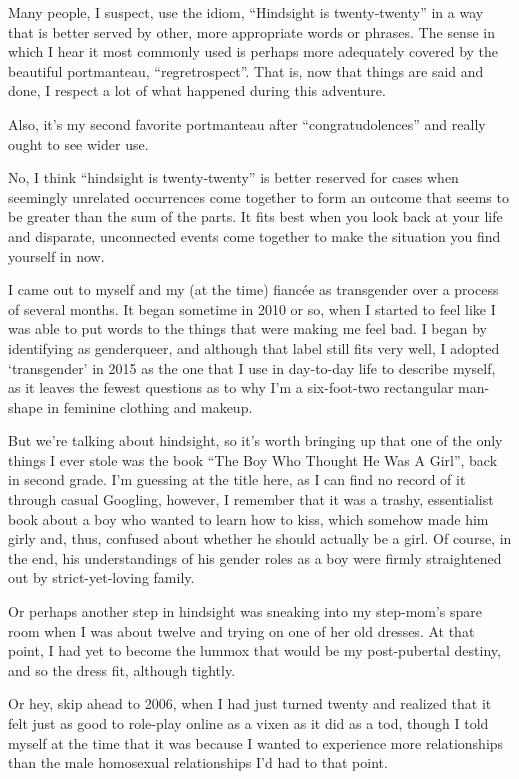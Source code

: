 Many people, I suspect, use the idiom, ``Hindsight is twenty-twenty'' in a way that is better served by other, more appropriate words or phrases.   The sense in which I hear it most commonly used is perhaps more adequately covered by the beautiful portmanteau, ``regretrospect''.  That is, now that things are said and done, I respect a lot of what happened during this adventure.

Also, it's my second favorite portmanteau after ``congratudolences'' and really ought to see wider use.

No, I think ``hindsight is twenty-twenty'' is better reserved for cases when seemingly unrelated occurrences come together to form an outcome that seems to be greater than the sum of the parts.  It fits best when you look back at your life and disparate, unconnected events come together to make the situation you find yourself in now.

I came out to myself and my (at the time) fianc\'ee as transgender over a process of several months.  It began sometime in 2010 or so, when I started to feel like I was able to put words to the things that were making me feel bad.  I began by identifying as genderqueer, and although that label still fits very well, I adopted `transgender' in 2015 as the one that I use in day-to-day life to describe myself, as it leaves the fewest questions as to why I'm a six-foot-two rectangular man-shape in feminine clothing and makeup.

But we're talking about hindsight, so it's worth bringing up that one of the only things I ever stole was the book ``The Boy Who Thought He Was A Girl'', back in second grade.  I'm guessing at the title here, as I can find no record of it through casual Googling, however, I remember that it was a trashy, essentialist book about a boy who wanted to learn how to kiss, which somehow made him girly and, thus, confused about whether he should actually be a girl.  Of course, in the end, his understandings of his gender roles as a boy were firmly straightened out by strict-yet-loving family.

Or perhaps another step in hindsight was sneaking into my step-mom's spare room when I was about twelve and trying on one of her old dresses.  At that point, I had yet to become the lummox that would be my post-pubertal destiny, and so the dress fit, although tightly.

Or hey, skip ahead to 2006, when I had just turned twenty and realized that it felt just as good to role-play online as a vixen as it did as a tod, though I told myself at the time that it was because I wanted to experience more relationships than the male homosexual relationships I'd had to that point.

